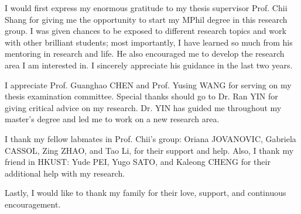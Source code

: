 \acknowledgments

I would first express my enormous gratitude to my thesis supervisor Prof. Chii Shang for giving me the opportunity to start my MPhil degree in this research group. I was given chances to be exposed to different research topics and work with other brilliant students; most importantly, I have learned so much from his mentoring in research and life. He also encouraged me to develop the research area I am interested in. I sincerely appreciate his guidance in the last two years.

I appreciate Prof. Guanghao CHEN and Prof. Yusing WANG for serving on my thesis examination committee. Special thanks should go to Dr. Ran YIN for giving critical advice on my research. Dr. YIN has guided me throughout my master's degree and led me to work on a new research area.

I thank my fellow labmates in Prof. Chii's group: Oriana JOVANOVIC, Gabriela CASSOL, Zing ZHAO, and Tao Li, for their support and help. Also, I thank my friend in HKUST: Yude PEI, Yugo SATO, and Kaleong CHENG for their additional help with my research.

Lastly, I would like to thank my family for their love, support, and continuous encouragement.

\endacknowledgments
